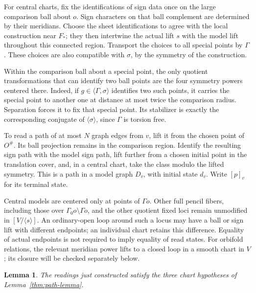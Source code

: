 \documentclass[11pt,reqno]{amsart}
\numberwithin{equation}{section}
\newtheorem{lemma}[theorem]{Lemma}
\theoremstyle{definition}
\theoremstyle{remark}
\begin{document}
For central charts, fix the identifications of sign data once on the
large comparison ball about $o$.  Sign characters on that ball
complement are determined by their meridians.  Choose the sheet
identifications to agree with the local construction near $F_*$;
they then intertwine the actual lift $s$ with the model lift
throughout this connected region.  Transport the choices to all
special points by $\Gamma$.  These choices are also compatible with
$\sigma$, by the symmetry of the construction.

Within the comparison ball about a special point, the only quotient
transformations that can identify two ball points are the four
symmetry powers centered there.  Indeed, if $g\in\langle\Gamma,
\sigma\rangle$ identifies two such points, it carries the special
point to another one at distance at most twice the comparison radius.
Separation forces it to fix that special point.  Its stabilizer is
exactly the corresponding conjugate of $\langle\sigma\rangle$,
since $\Gamma$ is torsion free.

To read a path of at most $N$ graph edges from $v$, lift it from the
chosen point of $O^\#$.  Its ball projection remains in the comparison
region.  Identify the resulting sign path with the model sign path,
lift further from a chosen initial point in the translation cover,
and, in a central chart, take the class modulo the lifted symmetry.
This is a path in a model graph $D_v$, with initial state $d_v$.
Write $[p]_v$ for its terminal state.

Central models are centered only at points of $\Gamma o$.  Other
full pencil fibers, including those over
$\Gamma_0o\setminus\Gamma o$, and the other quotient fixed loci
remain unmodified in $[V/\langle s\rangle]$.  An ordinary-open loop around such a locus may have a ball or
sign lift with different endpoints; an individual chart retains this
difference.  Equality of actual endpoints is not required to imply
equality of read states.  For orbifold relations, the relevant
meridian power lifts to a closed loop in a smooth chart in $V$;
its closure will be checked separately below.

\begin{lemma}\label{app:chart-axioms}
The readings just constructed satisfy the three chart hypotheses of
Lemma~\ref{thm:path-lemma}.
\end{lemma}
\end{document}
